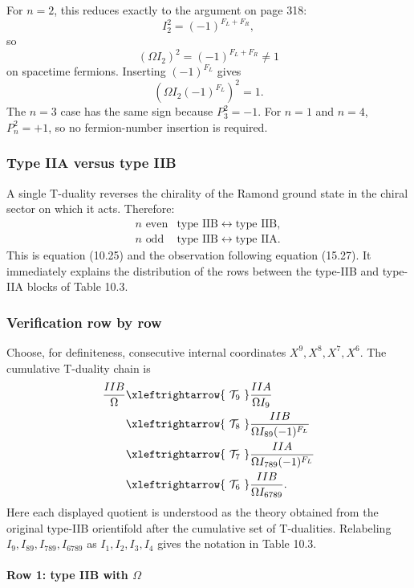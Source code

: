 \documentclass[
  10pt,
  a4paper,
  openany]{book}
\begin{document}
For \(n=2\), this reduces exactly to the argument on page 318: \[
I_2^2=(-1)^{F_L+F_R},
\] so \[
(\Omega I_2)^2
=
(-1)^{F_L+F_R}
\neq1
\] on spacetime fermions. Inserting \((-1)^{F_L}\) gives \[
\boxed{
\left(
\Omega I_2(-1)^{F_L}
\right)^2
=1
}.
\] The \(n=3\) case has the same sign because \(P_3^2=-1\). For \(n=1\)
and \(n=4\), \(P_n^2=+1\), so no fermion-number insertion is required.

\subsubsection{Type IIA versus type IIB}\label{type-iia-versus-type-iib}

A single T-duality reverses the chirality of the Ramond ground state in
the chiral sector on which it acts. Therefore: \[
\begin{array}{c|c}
n\text{ even}
&
\text{type IIB}\longleftrightarrow\text{type IIB},
\\
n\text{ odd}
&
\text{type IIB}\longleftrightarrow\text{type IIA}.
\end{array}
\] This is equation (10.25) and the observation following equation
(15.27). It immediately explains the distribution of the rows between
the type-IIB and type-IIA blocks of Table 10.3.

\subsubsection{Verification row by row}\label{verification-row-by-row}

Choose, for definiteness, consecutive internal coordinates
\(X^9,X^8,X^7,X^6\). The cumulative T-duality chain is \[
\begin{aligned}
\frac{IIB}{\Omega}
&\xleftrightarrow{\ \mathcal T_9\ }
\frac{IIA}{\Omega I_9}\\
&\xleftrightarrow{\ \mathcal T_8\ }
\frac{IIB}{\Omega I_{89}(-1)^{F_L}}\\
&\xleftrightarrow{\ \mathcal T_7\ }
\frac{IIA}{\Omega I_{789}(-1)^{F_L}}\\
&\xleftrightarrow{\ \mathcal T_6\ }
\frac{IIB}{\Omega I_{6789}}.
\end{aligned}
\] Here each displayed quotient is understood as the theory obtained
from the original type-IIB orientifold after the cumulative set of
T-dualities. Relabeling \(I_9,I_{89},I_{789},I_{6789}\) as
\(I_1,I_2,I_3,I_4\) gives the notation in Table 10.3.

\paragraph{\texorpdfstring{Row 1: type IIB with
\(\Omega\)}{Row 1: type IIB with \textbackslash Omega}}\label{row-1-type-iib-with-omega}
\end{document}
